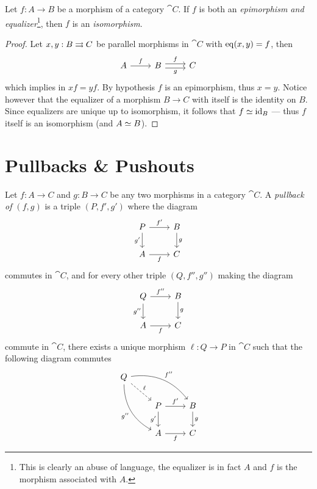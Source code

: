 \begin{proposition}
\label{prop:epi-and-eq-is-iso}
Let \(f: A \to B\) be a morphism of a category \(\cat C\). If \(f\) is both an
\emph{epimorphism and equalizer}\footnote{This is clearly an abuse of language,
  the equalizer is in fact \(A\) and \(f\) is the morphism associated with
  \(A\).}, then \(f\) is an \emph{isomorphism}.
\end{proposition}

\begin{proof}
Let \(x, y: B \rightrightarrows C\) be parallel morphisms in \(\cat C\) with \(\operatorname{eq}(x, y) =
f\), then
\[
\begin{tikzcd}
A \ar[r, "f"] & B \ar[r, shift right, "g"'] \ar[r, shift left, "f"] &C
\end{tikzcd}
\]
which implies in \(x f = y f\). By hypothesis \(f\) is an epimorphism, thus
\(x = y\). Notice however that the equalizer of a morphism \(B \to C\) with
itself is the identity on \(B\). Since equalizers are unique up to isomorphism,
it follows that \(f \simeq \operatorname{id}_B\) --- thus \(f\) itself is an isomorphism (and
\(A \simeq B\)).
\end{proof}

\section{Pullbacks \& Pushouts}

\begin{definition}[Pullback]
\label{def:pullback}
Let \(f: A \to C\) and \(g: B \to C\) be any two morphisms in a category
\(\cat C\). A \emph{pullback of \((f, g)\)} is a triple \((P, f', g')\)
where the diagram
\[
\begin{tikzcd}
P \ar[r, "f'"] \ar[d, "g'"'] &B \ar[d, "g"]
\\
A \ar[r, "f"'] &C
\end{tikzcd}
\]
commutes in \(\cat C\), and for every other triple \((Q, f'', g'')\) making the
diagram
\[
\begin{tikzcd}
Q \ar[r, "f''"] \ar[d, "g''"'] &B \ar[d, "g"]
\\
A \ar[r, "f"'] &C
\end{tikzcd}
\]
commute in \(\cat C\), there exists a unique morphism \(\ell: Q \to P\) in
\(\cat C\) such that the following diagram commutes
\[
\begin{tikzcd}
Q \ar[dr, dashed, "\ell"]
\ar[rrd, bend left, "f''"]
\ar[drd, bend right, "g''"']
& &
\\
&P \ar[r, "f'"] \ar[d, "g'"'] &B \ar[d, "g"]
\\
&A \ar[r, "f"'] &C
\end{tikzcd}
\]
\end{definition}

